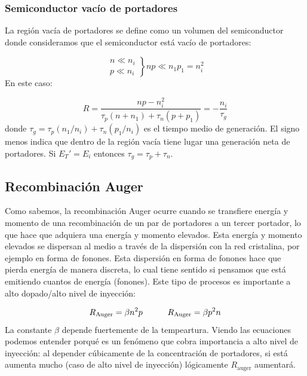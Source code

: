 \subsubsection{Semiconductor vacío de portadores}

La región vacía de portadores se define como un volumen del semiconductor donde consideramos que el semiconductor está vacío de portadores:

\begin{equation}
	\left. \begin{matrix}
		n \ll n_i \\
		p \ll n_i
	\end{matrix} \right\rbrace np \ll n_1 p_1 = n_i^2
\end{equation}
En este caso:

\begin{equation}
	R = \frac{np-n_i^2}{\tau_p (n+n_1)+\tau_n(p+p_1)} = - \frac{n_i}{\tau_g}
\end{equation}
donde $\tau_g = \tau_p (n_1/n_i) + \tau_n (p_1 / n_i)$ es el tiempo medio de generación. El signo menos indica que dentro de la región vacía tiene lugar una generación neta de portadores. Si $E_T'=E_i$ entonces $\tau_g=\tau_p+\tau_n$.

\subsection{Recombinación Auger}

Como sabemos, la recombinación Auger ocurre cuando se transfiere energía y momento de una recombinación de un par de portadores a un tercer portador, lo que hace que adquiera una energía y momento elevados. Esta energía y momento elevados se dispersan al medio a través de la dispersión con la red cristalina, por ejemplo en forma de fonones. Esta dispersión en forma de fonones hace que pierda energía de manera discreta, lo cual tiene sentido si pensamos que está emitiendo cuantos de energía (fonones). Este tipo de procesos es importante a alto dopado/alto nivel de inyección:

\begin{equation}
	R_{\text{Auger}} = \beta n^2 p \quad \quad \quad R_{\text{Auger}} = \beta p^2 n
\end{equation}
La constante $\beta$ depende fuertemente de la tempeartura. Viendo las ecuaciones podemos entender porqué es un fenómeno que cobra importancia a alto nivel de inyección: al depender cúbicamente de la concentración de portadores, si está aumenta mucho (caso de alto nivel de inyección) lógicamente $R_{\text{auger}}$ aumentará.



